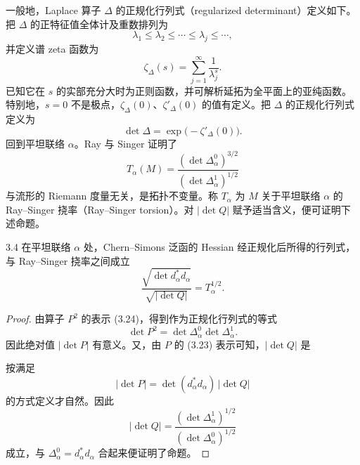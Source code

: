 
一般地，Laplace 算子 $\Delta$ 的正规化行列式（regularized determinant）定义如下。把 $\Delta$ 的正特征值全体计及重数排列为
\[
  \lambda_{1}\le\lambda_{2}\le\cdots\le\lambda_{j}\le\cdots,
\]
并定义谱 zeta 函数为
\[
  \zeta_{\Delta}(s)=\sum_{j=1}^{\infty}\frac{1}{\lambda_{j}^{s}} .
\]
已知它在 $s$ 的实部充分大时为正则函数，并可解析延拓为全平面上的亚纯函数。特别地，$s=0$ 不是极点，$\zeta_{\Delta}(0)$、$\zeta'_{\Delta}(0)$ 的值有定义。把 $\Delta$ 的正规化行列式定义为
\[
  \det\Delta=\exp\bigl(-\zeta'_{\Delta}(0)\bigr).
\]
回到平坦联络 $\alpha$。Ray 与 Singer 证明了
\[
  T_{\alpha}(M)=\frac{(\det\Delta^{0}_{\alpha})^{3/2}}{(\det\Delta^{1}_{\alpha})^{1/2}}
\]
与流形的 Riemann 度量无关，是拓扑不变量。称 $T_{\alpha}$ 为 $M$ 关于平坦联络 $\alpha$ 的 Ray--Singer 挠率（Ray--Singer torsion）。对 $|\det Q|$ 赋予适当含义，便可证明下述命题。

\begin{proposition*}{3.4}
在平坦联络 $\alpha$ 处，Chern--Simons 泛函的 Hessian 经正规化后所得的行列式，与 Ray--Singer 挠率之间成立
\[
  \frac{\sqrt{\det d^{*}_{\alpha}d_{\alpha}}}{\sqrt{|\det Q|}}
  =T_{\alpha}^{1/2} .
\]
\end{proposition*}

\begin{proof}
由算子 $P^{2}$ 的表示 (3.24)，得到作为正规化行列式的等式
\[
  \det P^{2}=\det\Delta^{0}_{\alpha}\det\Delta^{1}_{\alpha} .
\]
因此绝对值 $|\det P|$ 有意义。又，由 $P$ 的 (3.23) 表示可知，$|\det Q|$ 是

按满足
\[
  |\det P|=\det(d^{*}_{\alpha}d_{\alpha})\,|\det Q|
\]
的方式定义才自然。因此
\[
  |\det Q|=\frac{(\det\Delta^{1}_{\alpha})^{1/2}}{(\det\Delta^{0}_{\alpha})^{1/2}}
\]
成立，与 $\Delta^{0}_{\alpha}=d^{*}_{\alpha}d_{\alpha}$ 合起来便证明了命题。
\end{proof}


